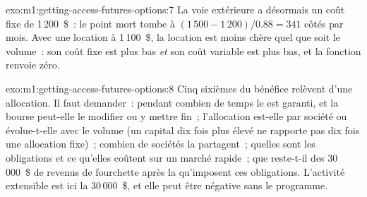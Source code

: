 \begin{solution}{exo:m1:getting-access-futures-options:7}
La voie extérieure a désormais un coût fixe de 1\,200~\$~: le point mort tombe à
$(1\,500 - 1\,200)/0.88 = 341$ côtés par mois. Avec une location à 1\,100~\$, la location
est moins chère quel que soit le volume~: son coût fixe est plus bas \emph{et} son coût variable
est plus bas, et la fonction renvoie zéro.
\end{solution}

\begin{solution}{exo:m1:getting-access-futures-options:8}
Cinq sixièmes du bénéfice relèvent d'une allocation. Il faut demander~: pendant combien de temps le  est
garanti, et la bourse peut-elle le modifier ou y mettre fin~; l'allocation est-elle par société
ou évolue-t-elle avec le volume (un capital dix fois plus élevé ne rapporte pas dix fois une
allocation fixe)~; combien de sociétés la partagent~; quelles sont les obligations et
ce qu'elles coûtent sur un marché rapide~; que reste-t-il des 30\,000~\$ de revenus de fourchette après la
 qu'imposent ces obligations. L'activité extensible est ici la
30\,000~\$, et elle peut être négative sans le programme.
\end{solution}

